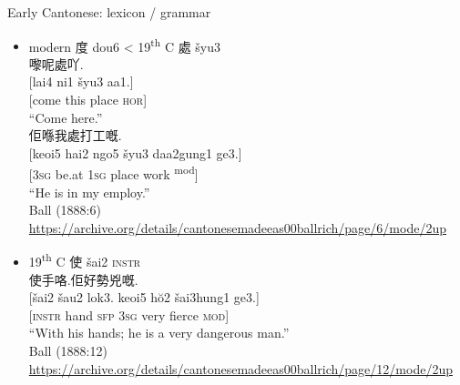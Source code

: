 \documentclass{beamer}
\begin{document}
\begin{frame}[fragile]{Early Cantonese: lexicon / grammar}

\begin{itemize}
    \item modern 度 dou6 < 19\textsuperscript{th} C 處 šyu3\\
    \smallskip
    {\footnotesize 嚟呢處吖.\\
    {[lai4 ni1 šyu3 aa1.]}\\
    {[come this place \textsc{hor}]}\\
    \enquote{Come here.}\\
    佢喺我處打工嘅.\\
    {[keoi5 hai2 ngo5 šyu3 daa2gung1 ge3.]}\\
    {[\textsc{3sg} be.at \textsc{1sg} place work \textsuperscript{mod}]}\\
    \enquote{He is in my employ.}\\
    }
    {\tiny Ball (1888:6) \url{https://archive.org/details/cantonesemadeeas00ballrich/page/6/mode/2up}}\\
    \item 19\textsuperscript{th} C 使 šai2 \textsc{instr}\\
    \smallskip
    {\footnotesize 使手咯.佢好勢兇嘅.\\
    {[šai2 šau2 lok3. keoi5 hŏ2 šai3hung1 ge3.]}\\
    {[\textsc{instr} hand \textsc{sfp} \textsc{3sg} very fierce \textsc{mod}]}\\
    \enquote{With his hands; he is a very dangerous man.}\\
    }
     {\tiny Ball (1888:12) \url{https://archive.org/details/cantonesemadeeas00ballrich/page/12/mode/2up}}\\
     
\end{itemize}

\end{frame}
\end{document}
